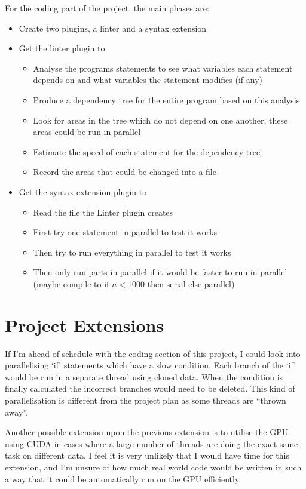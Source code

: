 \documentclass[12pt, a4paper]{article}
\begin{document}
For the coding part of the project, the main phases are:
\begin{itemize}
	\item Create two plugins, a linter and a syntax extension
	\item Get the linter plugin to
	\begin{itemize}
		\item Analyse the programs statements to see what variables each statement depends on and what variables the statement modifies (if any)
		\item Produce a dependency tree for the entire program based on this analysis
		\item Look for areas in the tree which do not depend on one another, these areas could be run in parallel
		\item Estimate the speed of each statement for the dependency tree
		\item Record the areas that could be changed into a file
	\end{itemize}
	\item Get the syntax extension plugin to
	\begin{itemize}
		\item Read the file the Linter plugin creates
		\item First try one statement in parallel to test it works
		\item Then try to run everything in parallel to test it works
		\item Then only run parts in parallel if it would be faster to run in parallel (maybe compile to if $n < 1000$ then serial else parallel)
	\end{itemize}

\end{itemize}

\section{Project Extensions}
If I'm ahead of schedule with the coding section of this project, I could look into parallelising `if' statements which have a slow condition. Each branch of the `if' would be run in a separate thread using cloned data. When the condition is finally calculated the incorrect branches would need to be deleted. This kind of parallelisation is different from the project plan as some threads are ``thrown away''.

Another possible extension upon the previous extension is to utilise the GPU using CUDA in cases where a large number of threads are doing the exact same task on different data. I feel it is very unlikely that I would have time for this extension, and I'm unsure of how much real world code would be written in such a way that it could be automatically run on the GPU efficiently.
\end{document}
